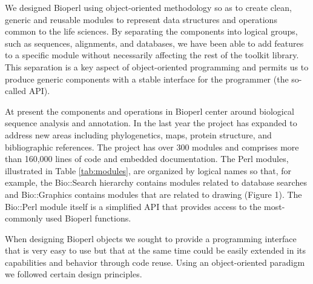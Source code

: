 \documentclass[12pt]{article}
\begin{document}
We designed Bioperl using object-oriented methodology so as to create
clean, generic and reusable modules to represent data structures and
operations common to the life sciences.  By separating the components
into logical groups, such as sequences, alignments, and databases, we
have been able to add features to a specific module without
necessarily affecting the rest of the toolkit library.  This
separation is a key aspect of object-oriented programming and permits
us to produce generic components with a stable interface for the
programmer (the so-called API).

At present the components and operations in Bioperl center around
biological sequence analysis and annotation.  In the last year the
project has expanded to address new areas including phylogenetics,
maps, protein structure, and bibliographic references.  The project
has over 300 modules and comprises more than 160,000 lines of code and
embedded documentation.  The Perl modules, illustrated in Table
\ref{tab:modules}, are organized by logical names so that, for
example, the Bio::Search hierarchy contains modules related to
database searches and Bio::Graphics contains modules that are related
to drawing (Figure 1).  The Bio::Perl module itself is a simplified
API that provides access to the most-commonly used Bioperl functions.

When designing Bioperl objects we sought to provide a
programming interface that is very easy to use but that at the same
time could be easily extended in its capabilities and behavior through
code reuse.  Using an object-oriented paradigm we followed certain
design principles.
\end{document}
